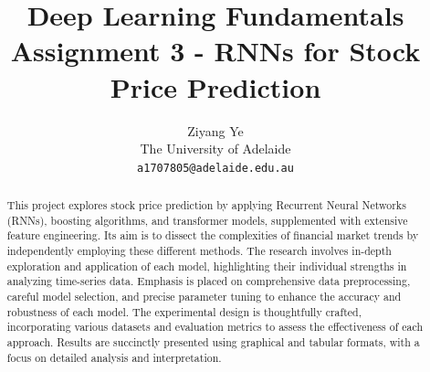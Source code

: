 \documentclass[10pt,twocolumn,letterpaper]{article}
\begin{document}
\title{Deep Learning Fundamentals\\
	Assignment 3 - RNNs for Stock Price Prediction}

\author{Ziyang Ye\\
The University of Adelaide\\
{\tt\small a1707805@adelaide.edu.au}}
\maketitle

\begin{abstract}
	This project explores stock price prediction by applying Recurrent Neural Networks (RNNs), boosting algorithms, and transformer models, supplemented with extensive feature engineering.
	Its aim is to dissect the complexities of financial market trends by independently employing these different methods.
	The research involves in-depth exploration and application of each model, highlighting their individual strengths in analyzing time-series data.
	Emphasis is placed on comprehensive data preprocessing, careful model selection, and precise parameter tuning to enhance the accuracy and robustness of each model.
	The experimental design is thoughtfully crafted, incorporating various datasets and evaluation metrics to assess the effectiveness of each approach.
	Results are succinctly presented using graphical and tabular formats, with a focus on detailed analysis and interpretation.
\end{abstract}

\end{document}
